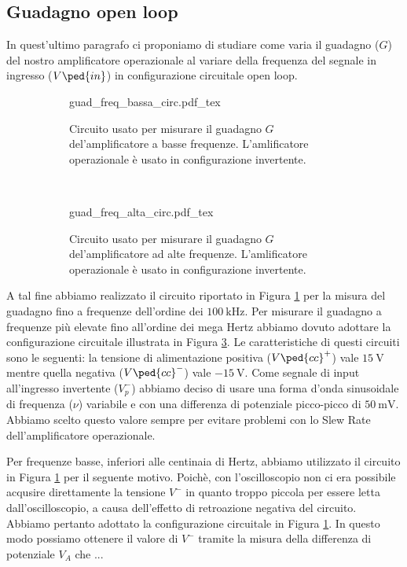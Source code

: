 \subsection*{Guadagno open loop}

In quest'ultimo paragrafo ci proponiamo di studiare come varia il guadagno ($G$) del nostro amplificatore operazionale al variare della frequenza del segnale in ingresso ($V\ped{in}$) in configurazione circuitale open loop.

\begin{figure}[h]
        \centering
        \begin{subfigure}[b]{0.45\textwidth}
        	\def\svgwidth{\textwidth}
                {guad_freq_bassa_circ.pdf_tex}
                \caption{Circuito usato per misurare il guadagno $G$ del'amplificatore a basse frequenze. L'amlificatore operazionale è usato in configurazione invertente.}
                \label{fig:G_open_loop_basso}
        \end{subfigure}
        ~
        \begin{subfigure}[b]{0.45\textwidth}
        	\def\svgwidth{\textwidth}
                {guad_freq_alta_circ.pdf_tex}
                \caption{Circuito usato per misurare il guadagno $G$ del'amplificatore ad alte frequenze. L'amlificatore operazionale è usato in configurazione invertente.}
                \label{fig:G_open_loop_alto}
        \end{subfigure}
        \caption{}
\end{figure}

A tal fine abbiamo realizzato il circuito riportato in Figura \ref{fig:G_open_loop_basso} per la misura del guadagno fino a frequenze dell'ordine dei $\SI{100}{\kilo\hertz}$. Per misurare il guadagno a frequenze più elevate fino all'ordine dei mega Hertz abbiamo dovuto adottare la configurazione circuitale illustrata in Figura \ref{fig:G_open_loop_alto}. Le caratteristiche di questi circuiti sono le seguenti: la tensione di alimentazione positiva ($V\ped{cc}^+$) vale $\SI{+15}{\volt}$ mentre quella negativa ($V\ped{cc}^-$) vale $\SI{-15}{\volt}$. Come segnale di input all'ingresso invertente ($V_p^-$) abbiamo deciso di usare una forma d'onda sinusoidale di frequenza ($\nu$) variabile e con una differenza di potenziale picco-picco di $\SI{50}{\milli\volt}$. Abbiamo scelto questo valore sempre per evitare problemi con lo Slew Rate dell'amplificatore operazionale.

Per frequenze basse, inferiori alle centinaia di Hertz, abbiamo utilizzato il circuito in Figura \ref{fig:G_open_loop_basso} per il seguente motivo. Poichè, con l'oscilloscopio non ci era possibile acqusire direttamente la tensione $V^-$ in quanto troppo piccola per essere letta dall'oscilloscopio, a causa dell'effetto di retroazione negativa del circuito. Abbiamo pertanto adottato la configurazione circuitale in Figura \ref{fig:G_open_loop_basso}. In questo modo possiamo ottenere il valore di $V^-$ tramite la misura della differenza di potenziale $V_A$ che ...

